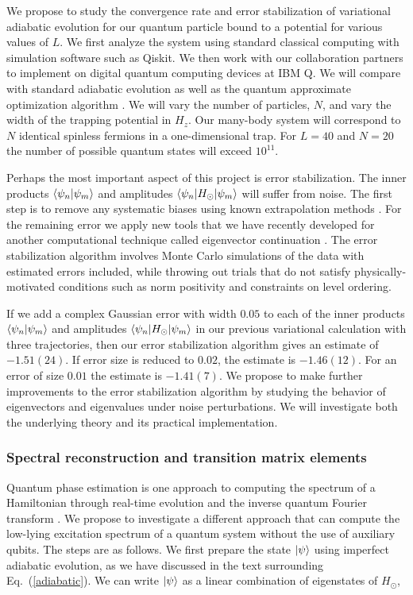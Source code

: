 \documentclass[10pt]{article}
\begin{document}
We propose to study the convergence rate and error stabilization of
variational adiabatic evolution for our quantum particle bound to a
potential for various values of $L$.  We first analyze the system
using standard classical computing with simulation software such as
Qiskit.  We then work with our collaboration partners to implement on
digital quantum computing devices at IBM Q.  We will
compare with standard adiabatic evolution as well as the quantum
approximate optimization algorithm \cite{Farhi:2014}. We will vary the
number of particles, $N$, and vary the width of the trapping potential
in $H_z$.  Our many-body system will correspond to $N$ identical
spinless fermions in a one-dimensional trap.  For $L = 40$ and $N =
20$ the number of possible quantum states will exceed $10^{11}$.

Perhaps the most important aspect of this project is error
stabilization.  The inner products $\braket{\psi_n|\psi_m}$ and
amplitudes $\braket{\psi_n|H_\odot|\psi_m}$ will suffer from noise.
The first step is to remove any systematic biases using known
extrapolation methods \cite{Kandala:2019}. For the remaining error we
apply new tools that we have recently developed for another
computational technique called eigenvector continuation
\cite{Frame:2017fah}.  The error stabilization algorithm involves
Monte Carlo simulations of the data with estimated errors included,
while throwing out trials that do not satisfy physically-motivated
conditions such as norm positivity and constraints on level ordering.
    
If we add a complex Gaussian error with width $0.05$ to each of the
inner products $\braket{\psi_n|\psi_m}$ and amplitudes
$\braket{\psi_n|H_\odot|\psi_m}$ in our previous variational
calculation with three trajectories, then our error stabilization
algorithm gives an estimate of $-1.51(24)$. If error size is reduced
to $0.02$, the estimate is $-1.46(12)$. For an error of size $0.01$
the estimate is $-1.41(7)$.  We propose to make further improvements
to the error stabilization algorithm by studying the behavior of
eigenvectors and eigenvalues under noise perturbations.  We will
investigate both the underlying theory and its practical
implementation.

\subsubsection{Spectral reconstruction and transition matrix elements}
     
Quantum phase estimation is one approach to computing the spectrum of
a Hamiltonian through real-time evolution and the inverse quantum
Fourier transform \cite{Abrams:1999}.  We propose to investigate a
different approach that can compute the low-lying excitation spectrum
of a quantum system without the use of auxiliary qubits.  The steps
are as follows.  We first prepare the state $\ket{\psi}$ using
imperfect adiabatic evolution, as we have discussed in the text
surrounding Eq.~(\ref{adiabatic}). We can write $\ket{\psi}$ as a
linear combination of eigenstates of $H_\odot$,
\end{document}
